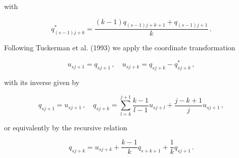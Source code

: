 \documentclass[11pt, a4paper]{article}
\begin{document}
with

\begin{equation}
  q^*_{(s-1)j+k}
  =
  \frac{(k-1)q_{(s-1)j+k+1} + q_{(s-1)j+1} }{k}
  \,.
\end{equation}

Following Tuckerman et al. (1993) we apply the coordinate transformation

\begin{equation}
  u_{sj+1} = q_{sj+1}\,,\quad
  u_{sj+k} = q_{sj+k} - q^*_{sj+k}\,,
\end{equation}

with its inverse given by

\begin{equation}
  q_{sj+1} = u_{sj+1}\,,\quad
  q_{sj+k} = \sum_{l=k}^{j+1}\frac{k-1}{l-1}u_{sj+l}
  +\frac{j-k+1}{j}u_{sj+1}\,,
\end{equation}

or equivalently by the recursive relation

\begin{equation}
  q_{sj+k} = u_{sj+k} + \frac{k-1}{k} q_{s+k+1}+ \frac{1}{k}q_{sj+1} \,.
\end{equation}
\end{document}
